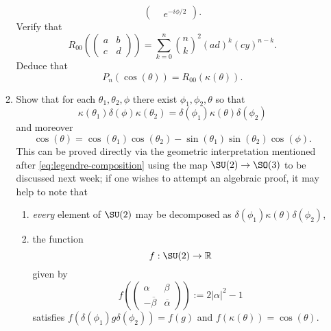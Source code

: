 \documentclass[reqno]{amsart} 
\begin{document}
\begin{homework}
\begin{enumerate}
\begin{enumerate}
\begin{equation*}
\begin{pmatrix}
                     & e^{-i \phi/2}
        \end{pmatrix}
.
      \end{equation*}
      Verify that
      \begin{equation*}
        R_{0 0}(
\begin{pmatrix}
          a & b \\
          c & d
        \end{pmatrix}
)
        = \sum_{k=0}^n
        {\binom{n}{k}}^2
        (a d)^k (c y)^{n-k}.
      \end{equation*}
      Deduce that
      \begin{equation*}
        P_n(\cos(\theta)) = R_{0 0}(\kappa(\theta)).
      \end{equation*}
    \item Show that for each $\theta_1,\theta_2,\phi$ there exist $\phi_1,\phi_2,\theta$ so that
      \begin{equation*}
        \kappa(\theta_1) \delta(\phi) \kappa(\theta_2) = \delta(\phi_1) \kappa(\theta) \delta(\phi_2)
      \end{equation*}
      and moreover
      \begin{equation*}
        \cos(\theta) = \cos(\theta_1) \cos(\theta_2) - \sin(\theta_1) \sin(\theta_2) \cos(\phi).
      \end{equation*}
      This can be proved directly via the geometric interpretation mentioned after \eqref{eq:legendre-composition} using the map $\SU(2) \rightarrow \SO(3)$ to be discussed next week; if one wishes to attempt an algebraic proof, it may help to note that
      \begin{enumerate}
      \item \emph{every} element of $\SU(2)$ may be decomposed as $\delta(\phi_1) \kappa(\theta) \delta(\phi_2)$,
      \item the function
        \begin{equation*}
          f : \SU(2) \rightarrow \mathbb{R}
        \end{equation*}
        given by
        \begin{equation*}
          f(
\begin{pmatrix}
            \alpha  & \beta  \\
            - \overline{\beta } & \overline{\alpha }
          \end{pmatrix}
          ) := 2 |\alpha|^2 - 1
        \end{equation*}
        satisfies $f(\delta(\phi_1) g \delta(\phi_2)) = f(g)$ and $f(\kappa(\theta)) = \cos(\theta)$.

\end{enumerate}
\end{enumerate}
\end{enumerate}
\end{homework}
\end{document}
